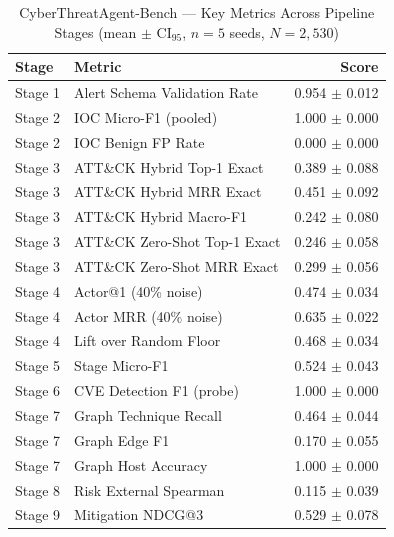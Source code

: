 \begin{table}[t]
\centering
\caption{CyberThreatAgent-Bench --- Key Metrics Across Pipeline Stages (mean $\pm$ CI$_{95}$, $n=5$ seeds, $N=2{,}530$)}
\label{tab:scorecard}
\begin{tabular}{llr}
\toprule
Stage & Metric & Score \\ \midrule
Stage 1 & Alert Schema Validation Rate & 0.954 $\pm$ 0.012 \\
Stage 2 & IOC Micro-F1 (pooled) & 1.000 $\pm$ 0.000 \\
Stage 2 & IOC Benign FP Rate & 0.000 $\pm$ 0.000 \\
Stage 3 & ATT\&CK Hybrid Top-1 Exact & 0.389 $\pm$ 0.088 \\
Stage 3 & ATT\&CK Hybrid MRR Exact & 0.451 $\pm$ 0.092 \\
Stage 3 & ATT\&CK Hybrid Macro-F1 & 0.242 $\pm$ 0.080 \\
Stage 3 & ATT\&CK Zero-Shot Top-1 Exact & 0.246 $\pm$ 0.058 \\
Stage 3 & ATT\&CK Zero-Shot MRR Exact & 0.299 $\pm$ 0.056 \\
Stage 4 & Actor@1 (40\% noise) & 0.474 $\pm$ 0.034 \\
Stage 4 & Actor MRR (40\% noise) & 0.635 $\pm$ 0.022 \\
Stage 4 & Lift over Random Floor & 0.468 $\pm$ 0.034 \\
Stage 5 & Stage Micro-F1 & 0.524 $\pm$ 0.043 \\
Stage 6 & CVE Detection F1 (probe) & 1.000 $\pm$ 0.000 \\
Stage 7 & Graph Technique Recall & 0.464 $\pm$ 0.044 \\
Stage 7 & Graph Edge F1 & 0.170 $\pm$ 0.055 \\
Stage 7 & Graph Host Accuracy & 1.000 $\pm$ 0.000 \\
Stage 8 & Risk External Spearman & 0.115 $\pm$ 0.039 \\
Stage 9 & Mitigation NDCG@3 & 0.529 $\pm$ 0.078 \\
\bottomrule
\end{tabular}
\end{table}
